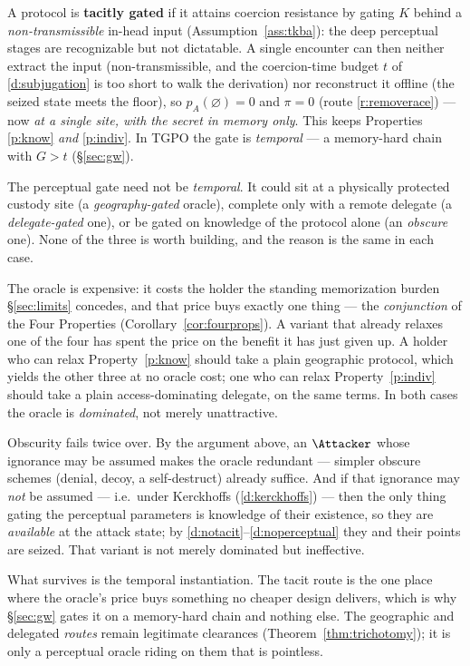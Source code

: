 \begin{definition}\label{def:tacit}
A protocol is \textbf{tacitly gated} if it attains coercion resistance by gating
$K$ behind a \emph{non-transmissible} in-head input (Assumption~\ref{ass:tkba}):
the deep perceptual stages are recognizable but not dictatable. A single encounter
can then neither extract the input (non-transmissible, and the coercion-time budget
$t$ of \ref{d:subjugation} is too short to walk the derivation) nor reconstruct it offline (the
seized state meets the floor), so $p_A(\varnothing) = 0$ and $\pi = 0$ (route \ref{r:removerace})
--- now \emph{at a single site, with the secret in memory only}. This keeps
Properties \ref{p:know} \emph{and} \ref{p:indiv}. In TGPO the gate is \emph{temporal} --- a memory-hard
chain with $G > t$ (\S\ref{sec:gw}).
\end{definition}

\begin{remark}\label{rem:po-variants}
The perceptual gate need not be \emph{temporal}. It could sit at a physically
protected custody site (a \emph{geography-gated} oracle), complete only with a
remote delegate (a \emph{delegate-gated} one), or be gated on knowledge of the
protocol alone (an \emph{obscure} one). None of the three is worth building, and
the reason is the same in each case.

The oracle is expensive: it costs the holder the standing memorization burden
\S\ref{sec:limits} concedes, and that price buys exactly one thing --- the
\emph{conjunction} of the Four Properties (Corollary~\ref{cor:fourprops}). A
variant that already relaxes one of the four has spent the price on the benefit it
has just given up. A holder who can relax Property~\ref{p:know} should take a
plain geographic protocol, which yields the other three at no oracle cost; one who
can relax Property~\ref{p:indiv} should take a plain access-dominating delegate,
on the same terms. In both cases the oracle is \emph{dominated}, not merely
unattractive.

Obscurity fails twice over. By the argument above, an $\Attacker$ whose ignorance
may be assumed makes the oracle redundant --- simpler obscure schemes (denial,
decoy, a self-destruct) already suffice. And if that ignorance may \emph{not} be
assumed --- i.e.\ under Kerckhoffs (\ref{d:kerckhoffs}) --- then the only thing
gating the perceptual parameters is knowledge of their existence, so they are
\emph{available} at the attack state; by \ref{d:notacit}--\ref{d:noperceptual}
they and their points are seized. That variant is not merely dominated but
ineffective.

What survives is the temporal instantiation. The tacit route is the one place
where the oracle's price buys something no cheaper design delivers, which is why
\S\ref{sec:gw} gates it on a memory-hard chain and nothing else. The geographic
and delegated \emph{routes} remain legitimate clearances
(Theorem~\ref{thm:trichotomy}); it is only a perceptual oracle riding on them that
is pointless.
\end{remark}

